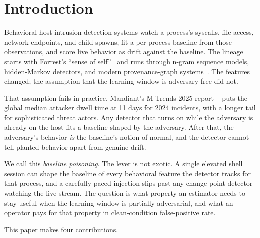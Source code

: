 \section{Introduction}
\label{sec:intro}

Behavioral host intrusion detection systems watch a process's
syscalls, file access, network endpoints, and child spawns, fit a
per-process baseline from those observations, and score live behavior
as drift against the baseline. The lineage starts with Forrest's
``sense of self''~\cite{forrest1996sense} and runs through n-gram
sequence models, hidden-Markov detectors, and modern provenance-graph
systems~\cite{goyal2023mimicry}. The features changed; the assumption
that the learning window is adversary-free did not.

That assumption fails in practice. Mandiant's M-Trends 2025 report
~\cite{mandiant2025mtrends} puts the global median attacker dwell time
at 11 days for 2024 incidents, with a longer tail for sophisticated
threat actors. Any detector that turns on while the adversary is
already on the host fits a baseline shaped by the adversary. After
that, the adversary's behavior \emph{is} the baseline's notion of
normal, and the detector cannot tell planted behavior apart from
genuine drift.

We call this \emph{baseline poisoning}. The lever is not exotic. A
single elevated shell session can shape the baseline of every
behavioral feature the detector tracks for that process, and a
carefully-paced injection slips past any change-point detector
watching the live stream. The question is what property an estimator
needs to stay useful when the learning window is partially
adversarial, and what an operator pays for that property in
clean-condition false-positive rate.

This paper makes four contributions.

